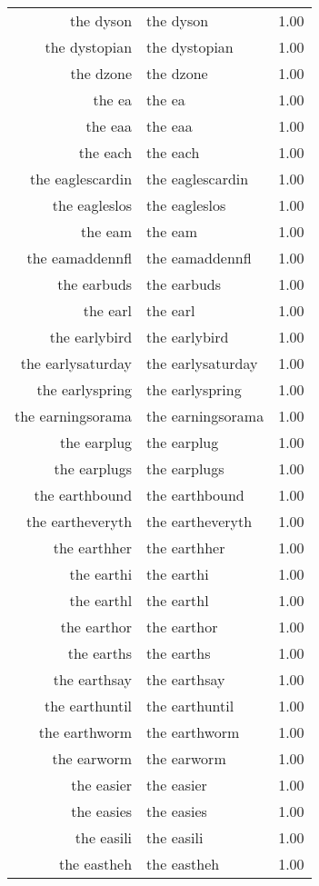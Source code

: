 \begin{table}[ht]
\begin{tabular}{rlr}
  the dyson & the dyson & 1.00 \\ 
  the dystopian & the dystopian & 1.00 \\ 
  the dzone & the dzone & 1.00 \\ 
  the ea & the ea & 1.00 \\ 
  the eaa & the eaa & 1.00 \\ 
  the each & the each & 1.00 \\ 
  the eaglescardin & the eaglescardin & 1.00 \\ 
  the eagleslos & the eagleslos & 1.00 \\ 
  the eam & the eam & 1.00 \\ 
  the eamaddennfl & the eamaddennfl & 1.00 \\ 
  the earbuds & the earbuds & 1.00 \\ 
  the earl & the earl & 1.00 \\ 
  the earlybird & the earlybird & 1.00 \\ 
  the earlysaturday & the earlysaturday & 1.00 \\ 
  the earlyspring & the earlyspring & 1.00 \\ 
  the earningsorama & the earningsorama & 1.00 \\ 
  the earplug & the earplug & 1.00 \\ 
  the earplugs & the earplugs & 1.00 \\ 
  the earthbound & the earthbound & 1.00 \\ 
  the eartheveryth & the eartheveryth & 1.00 \\ 
  the earthher & the earthher & 1.00 \\ 
  the earthi & the earthi & 1.00 \\ 
  the earthl & the earthl & 1.00 \\ 
  the earthor & the earthor & 1.00 \\ 
  the earths & the earths & 1.00 \\ 
  the earthsay & the earthsay & 1.00 \\ 
  the earthuntil & the earthuntil & 1.00 \\ 
  the earthworm & the earthworm & 1.00 \\ 
  the earworm & the earworm & 1.00 \\ 
  the easier & the easier & 1.00 \\ 
  the easies & the easies & 1.00 \\ 
  the easili & the easili & 1.00 \\ 
  the eastheh & the eastheh & 1.00 \\ 

\end{tabular}
\end{table}
